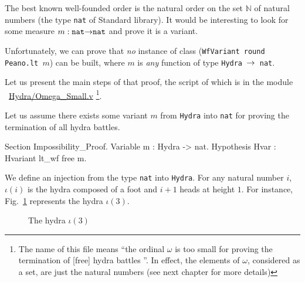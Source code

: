 \documentclass[a4paper]{book}
\begin{document}
The best known well-founded order is the natural order on the set $\mathbb{N}$ of natural numbers (the type \texttt{nat} of Standard library). It would be interesting to look for some measure $m:\texttt{nat}\mbox{$\rightarrow$}\texttt{nat}$ and prove it is a variant.

Unfortunately, we can prove that 
\emph{no} instance of class (\texttt{WfVariant round Peano.lt $m$}) can be built, where
$m$ is \emph{any} function of type \texttt{Hydra $\mbox{$\rightarrow$}$ nat}.


Let us present the main steps of that proof, the script of which  is in the module ~\href{../src/html/hydras.Hydra.Omega_Small.html}{Hydra/Omega\_Small.v} \footnote{ The name of this file means ``the ordinal $\omega$ is too small for proving the termination of [free] hydra battles ''. In effect, the elements of $\omega$, considered as a set, are just the natural numbers (see next chapter for more details)}.



Let us assume there exists some variant $m$ from \texttt{Hydra} into \texttt{nat} for proving
    the  termination of all hydra battles.

\begin{Coqsrc}
Section Impossibility_Proof.
 Variable m : Hydra -> nat.
 Hypothesis Hvar : Hvariant lt_wf free m.
\end{Coqsrc}

We define an injection from the type \texttt{nat} into \texttt{Hydra}.
For any natural number $i$, $\iota(i)$ is the hydra composed of a foot and
$i+1$ heads at height $1$. For instance, Fig.~\ref{fig:flower} represents the hydra $\iota(3)$.

\begin{figure}[htb]
\centering
{}
\caption{\label{fig:flower}
The hydra $\iota(3)$}
\end{figure}
\end{document}
